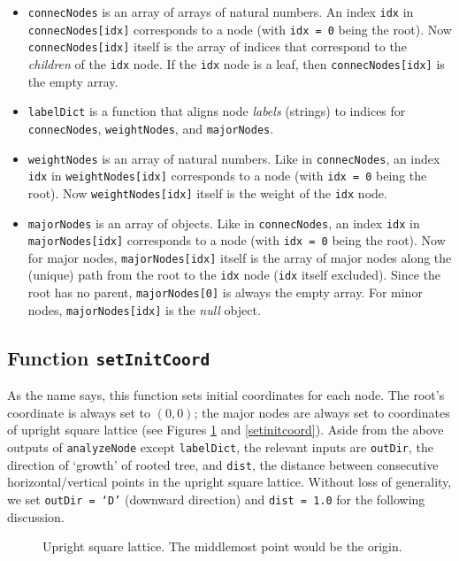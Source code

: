 \documentclass{article}
\theoremstyle{plain}
\theoremstyle{remark}
\begin{document}
\begin{itemize}
	\item \texttt{connecNodes} is an array of arrays of natural numbers. An index \texttt{idx} in \texttt{connecNodes[idx]} corresponds to a node (with \texttt{idx = 0} being the root). Now \texttt{connecNodes[idx]} itself is the array of indices that correspond to the \textit{children} of the \texttt{idx} node. If the \texttt{idx} node is a leaf, then \texttt{connecNodes[idx]} is the empty array.
	\item \texttt{labelDict} is a function that aligns node \textit{labels} (strings) to indices for \texttt{connecNodes}, \texttt{weightNodes}, and \texttt{majorNodes}.
	\item \texttt{weightNodes} is an array of natural numbers. Like in \texttt{connecNodes}, an index \texttt{idx} in \texttt{weightNodes[idx]} corresponds to a node (with \texttt{idx = 0} being the root). Now \texttt{weightNodes[idx]} itself is the weight of the \texttt{idx} node.
	\item \texttt{majorNodes} is an array of objects. Like in \texttt{connecNodes}, an index \texttt{idx} in \texttt{majorNodes[idx]} corresponds to a node (with \texttt{idx = 0} being the root). Now for major nodes, \texttt{majorNodes[idx]} itself is the array of major nodes along the (unique) path from the root to the \texttt{idx} node (\texttt{idx} itself excluded). Since the root has no parent, \texttt{majorNodes[0]} is always the empty array. For minor nodes, \texttt{majorNodes[idx]} is the \textit{null} object.
\end{itemize}

\subsection{Function \texttt{setInitCoord}}
As the name says, this function sets initial coordinates for each node. The root's coordinate is always set to $(0,0)$; the major nodes are always set to coordinates of upright square lattice (see Figures \ref{lattice} and \ref{setinitcoord}). Aside from the above outputs of \texttt{analyzeNode} except \texttt{labelDict}, the relevant inputs are \texttt{outDir}, the direction of `growth' of rooted tree, and \texttt{dist}, the distance between consecutive horizontal/vertical points in the upright square lattice. Without loss of generality, we set \texttt{outDir = `D'} (downward direction) and \texttt{dist = 1.0} for the following discussion.

\begin{figure}[htbp]
	\centering
	\caption{Upright square lattice. The middlemost point would be the origin.}
	\label{lattice}
\end{figure}
\end{document}
